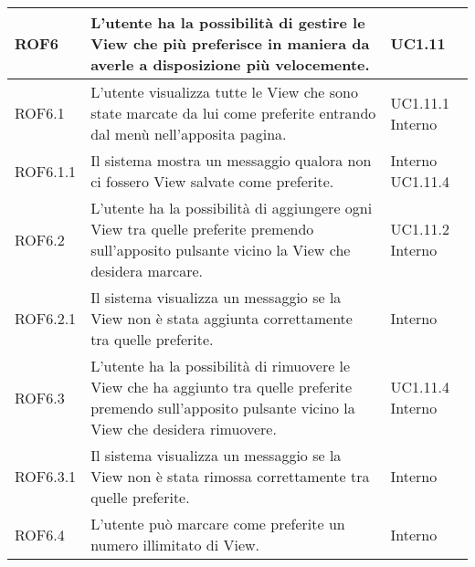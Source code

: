 \begin{center}
\begin{longtable}{| p{2.5cm} | p{8cm} | p{2cm} |}
		ROF6  & L'utente ha la possibilità di gestire le View che più preferisce in maniera da averle a disposizione più velocemente. & UC1.11 \\
		\hline
		ROF6.1  & L'utente visualizza tutte le View che sono state marcate da lui come preferite entrando dal menù nell'apposita pagina. & UC1.11.1 \newline Interno \\
		\hline
		ROF6.1.1  & Il sistema mostra un messaggio qualora non ci fossero View salvate come preferite. &  Interno \newline UC1.11.4 \\
		\hline
		ROF6.2  & L'utente ha la possibilità di aggiungere ogni View tra quelle preferite premendo sull'apposito pulsante vicino la View che desidera marcare.  & UC1.11.2 \newline Interno \\
		\hline
		ROF6.2.1  & Il sistema visualizza un messaggio se la View non è stata aggiunta correttamente tra quelle preferite.  & Interno \\
		\hline
		ROF6.3  & L'utente ha la possibilità di rimuovere le View che ha aggiunto tra quelle preferite premendo sull'apposito pulsante vicino la View che desidera rimuovere.  &  UC1.11.4 \newline Interno \\
		\hline
		ROF6.3.1  & Il sistema visualizza un messaggio se la View non è stata rimossa correttamente tra quelle preferite.  &  Interno \\
		\hline
		ROF6.4 & L'utente può marcare come preferite un numero illimitato di View. &  Interno \\
		\hline




\end{longtable}
\end{center}
